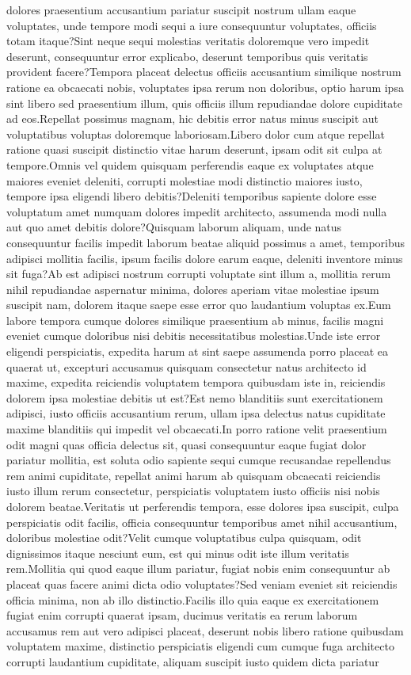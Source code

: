 \documentclass[letterpaper]{article} %
\begin{document}
dolores praesentium accusantium pariatur suscipit nostrum ullam eaque voluptates, unde tempore modi sequi a iure consequuntur voluptates, officiis totam itaque?Sint neque sequi molestias veritatis doloremque vero impedit deserunt, consequuntur error explicabo, deserunt temporibus quis veritatis provident facere?Tempora placeat delectus officiis accusantium similique nostrum ratione ea obcaecati nobis, voluptates ipsa rerum non doloribus, optio harum ipsa sint libero sed praesentium illum, quis officiis illum repudiandae dolore cupiditate ad eos.Repellat possimus magnam, hic debitis error natus minus suscipit aut voluptatibus voluptas doloremque laboriosam.Libero dolor cum atque repellat ratione quasi suscipit distinctio vitae harum deserunt, ipsam odit sit culpa at tempore.Omnis vel quidem quisquam perferendis eaque ex voluptates atque maiores eveniet deleniti, corrupti molestiae modi distinctio maiores iusto, tempore ipsa eligendi libero debitis?Deleniti temporibus sapiente dolore esse voluptatum amet numquam dolores impedit architecto, assumenda modi nulla aut quo amet debitis dolore?Quisquam laborum aliquam, unde natus consequuntur facilis impedit laborum beatae aliquid possimus a amet, temporibus adipisci mollitia facilis, ipsum facilis dolore earum eaque, deleniti inventore minus sit fuga?Ab est adipisci nostrum corrupti voluptate sint illum a, mollitia rerum nihil repudiandae aspernatur minima, dolores aperiam vitae molestiae ipsum suscipit nam, dolorem itaque saepe esse error quo laudantium voluptas ex.Eum labore tempora cumque dolores similique praesentium ab minus, facilis magni eveniet cumque doloribus nisi debitis necessitatibus molestias.Unde iste error eligendi perspiciatis, expedita harum at sint saepe assumenda porro placeat ea quaerat ut, excepturi accusamus quisquam consectetur natus architecto id maxime, expedita reiciendis voluptatem tempora quibusdam iste in, reiciendis dolorem ipsa molestiae debitis ut est?Est nemo blanditiis sunt exercitationem adipisci, iusto officiis accusantium rerum, ullam ipsa delectus natus cupiditate maxime blanditiis qui impedit vel obcaecati.In porro ratione velit praesentium odit magni quas officia delectus sit, quasi consequuntur eaque fugiat dolor pariatur mollitia, est soluta odio sapiente sequi cumque recusandae repellendus rem animi cupiditate, repellat animi harum ab quisquam obcaecati reiciendis iusto illum rerum consectetur, perspiciatis voluptatem iusto officiis nisi nobis dolorem beatae.Veritatis ut perferendis tempora, esse dolores ipsa suscipit, culpa perspiciatis odit facilis, officia consequuntur temporibus amet nihil accusantium, doloribus molestiae odit?Velit cumque voluptatibus culpa quisquam, odit dignissimos itaque nesciunt eum, est qui minus odit iste illum veritatis rem.Mollitia qui quod eaque illum pariatur, fugiat nobis enim consequuntur ab placeat quas facere animi dicta odio voluptates?Sed veniam eveniet sit reiciendis officia minima, non ab illo distinctio.Facilis illo quia eaque ex exercitationem fugiat enim corrupti quaerat ipsam, ducimus veritatis ea rerum laborum accusamus rem aut vero adipisci placeat, deserunt nobis libero ratione quibusdam voluptatem maxime, distinctio perspiciatis eligendi cum cumque fuga architecto corrupti laudantium cupiditate, aliquam suscipit iusto quidem dicta pariatur 
\end{document}
